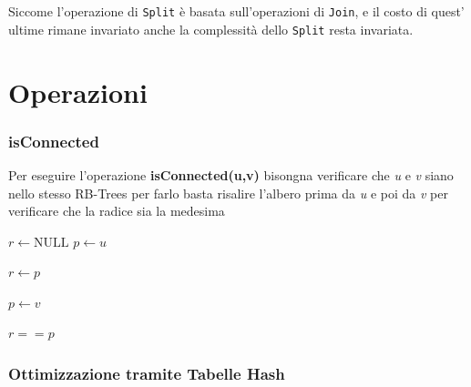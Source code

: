 Siccome l'operazione di \texttt{Split} è basata sull'operazioni 
di \texttt{Join}, e  il costo di quest' ultime rimane invariato 
anche la complessità dello \texttt{Split} resta invariata.

\section{Operazioni}

\subsubsection{isConnected}
Per eseguire l'operazione \textbf{isConnected(u,v)} bisongna verificare
che \textit{u} e \textit{v} siano nello stesso RB-Trees 
per farlo basta risalire l'albero prima da \textit{u} e poi da \textit{v} per verificare 
che la radice sia la medesima

\begin{algorithm}[H]
    \caption{isConnected}
    \label{alg:isConnectedEfficent}
    \SetAlgoLined
    \DontPrintSemicolon
    
    
    \BlankLine 
    $r \leftarrow \text{NULL}$\;
    $p \leftarrow u$ \;
    
    $r \leftarrow p$

    $p \leftarrow v$ \;
            
    \Return $r == p$
    
\end{algorithm}

\subsubsection{Ottimizzazione tramite Tabelle Hash}

